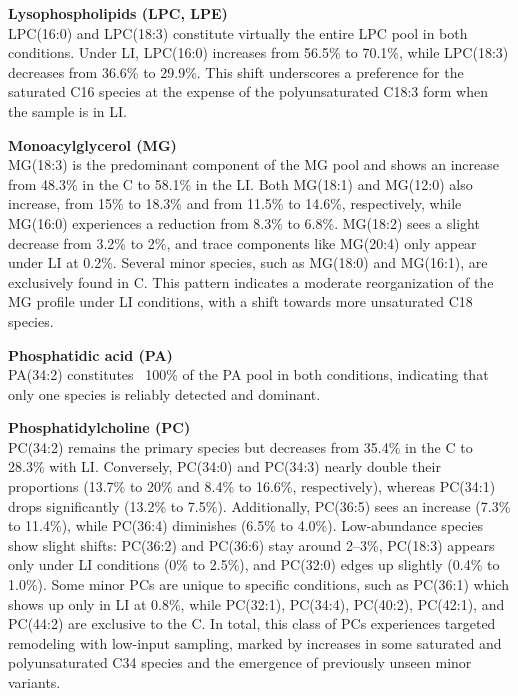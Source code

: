 \documentclass[10pt,letterpaper]{article}
\begin{document}
\textbf{Lysophospholipids (LPC, LPE)} \\
LPC(16:0) and LPC(18:3) constitute virtually the entire LPC pool in both conditions. Under LI, LPC(16:0) increases from 56.5\% to 70.1\%, while LPC(18:3) decreases from 36.6\% to 29.9\%. This shift underscores a preference for the saturated C16 species at the expense of the polyunsaturated C18:3 form when the sample is in LI.

\textbf{Monoacylglycerol (MG)}  \\
MG(18:3) is the predominant component of the MG pool and shows an increase from 48.3\% in the C to 58.1\% in the LI. Both MG(18:1) and MG(12:0) also increase, from 15\% to 18.3\% and from 11.5\% to 14.6\%, respectively, while MG(16:0) experiences a reduction from 8.3\% to 6.8\%. MG(18:2) sees a slight decrease from 3.2\% to 2\%, and trace components like MG(20:4) only appear under LI at 0.2\%. Several minor species, such as MG(18:0) and MG(16:1), are exclusively found in C. This pattern indicates a moderate reorganization of the MG profile under LI conditions, with a shift towards more unsaturated C18 species.


\textbf{Phosphatidic acid (PA)}  \\
PA(34:2) constitutes ~100\% of the PA pool in both conditions, indicating that only one species is reliably detected and dominant.

\textbf{Phosphatidylcholine (PC)} \\ 
PC(34:2) remains the primary species but decreases from 35.4\% in the C to 28.3\% with LI. Conversely, PC(34:0) and PC(34:3) nearly double their proportions (13.7\% to 20\% and 8.4\% to 16.6\%, respectively), whereas PC(34:1) drops significantly (13.2\% to 7.5\%). Additionally, PC(36:5) sees an increase (7.3\% to 11.4\%), while PC(36:4) diminishes (6.5\% to 4.0\%). Low-abundance species show slight shifts: PC(36:2) and PC(36:6) stay around 2–3\%, PC(18:3) appears only under LI conditions (0\% to 2.5\%), and PC(32:0) edges up slightly (0.4\% to 1.0\%). Some minor PCs are unique to specific conditions, such as PC(36:1) which shows up only in LI at 0.8\%, while PC(32:1), PC(34:4), PC(40:2), PC(42:1), and PC(44:2) are exclusive to the C. In total, this class of PCs experiences targeted remodeling with low-input sampling, marked by increases in some saturated and polyunsaturated C34 species and the emergence of previously unseen minor variants.
\end{document}
